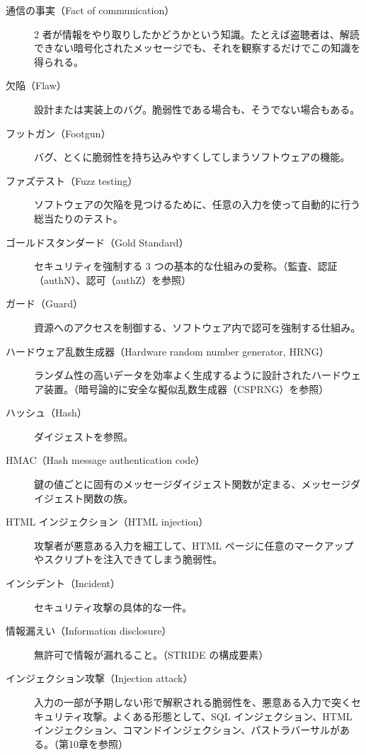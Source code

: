 \documentclass[uplatex]{jsarticle}
\begin{document}
\begin{description}
\item[通信の事実（Fact of communication）]
2 者が情報をやり取りしたかどうかという知識。たとえば盗聴者は、解読できない暗号化されたメッセージでも、それを観察するだけでこの知識を得られる。

\item[欠陥（Flaw）]
設計または実装上のバグ。脆弱性である場合も、そうでない場合もある。

\item[フットガン（Footgun）]
バグ、とくに脆弱性を持ち込みやすくしてしまうソフトウェアの機能。

\item[ファズテスト（Fuzz testing）]
ソフトウェアの欠陥を見つけるために、任意の入力を使って自動的に行う総当たりのテスト。

\item[ゴールドスタンダード（Gold Standard）]
セキュリティを強制する 3 つの基本的な仕組みの愛称。（監査、認証（authN）、認可（authZ）を参照）

\item[ガード（Guard）]
資源へのアクセスを制御する、ソフトウェア内で認可を強制する仕組み。

\item[ハードウェア乱数生成器（Hardware random number generator, HRNG）]
ランダム性の高いデータを効率よく生成するように設計されたハードウェア装置。（暗号論的に安全な擬似乱数生成器（CSPRNG）を参照）

\item[ハッシュ（Hash）]
ダイジェストを参照。

\item[HMAC（Hash message authentication code）]
鍵の値ごとに固有のメッセージダイジェスト関数が定まる、メッセージダイジェスト関数の族。

\item[HTML インジェクション（HTML injection）]
攻撃者が悪意ある入力を細工して、HTML ページに任意のマークアップやスクリプトを注入できてしまう脆弱性。

\item[インシデント（Incident）]
セキュリティ攻撃の具体的な一件。

\item[情報漏えい（Information disclosure）]
無許可で情報が漏れること。（STRIDE の構成要素）

\item[インジェクション攻撃（Injection attack）]
入力の一部が予期しない形で解釈される脆弱性を、悪意ある入力で突くセキュリティ攻撃。よくある形態として、SQL インジェクション、HTML インジェクション、コマンドインジェクション、パストラバーサルがある。（第10章を参照）


\end{description}
\end{document}
